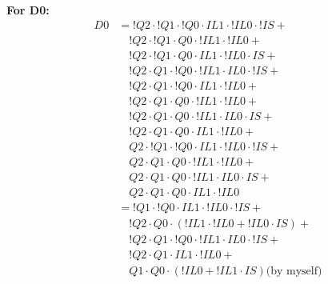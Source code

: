 \begin{multicols}{2}
    \textbf{For D0:}
    \begin{align*}
        D0  &=     !Q2 \cdot !Q1 \cdot !Q0 \cdot  IL1 \cdot !IL0 \cdot !IS + \\
            &\quad !Q2 \cdot !Q1 \cdot  Q0 \cdot !IL1 \cdot !IL0 + \\
            &\quad !Q2 \cdot !Q1 \cdot  Q0 \cdot  IL1 \cdot !IL0 \cdot  IS + \\
            &\quad !Q2 \cdot  Q1 \cdot !Q0 \cdot !IL1 \cdot  IL0 \cdot !IS + \\
            &\quad !Q2 \cdot  Q1 \cdot !Q0 \cdot  IL1 \cdot !IL0 + \\
            &\quad !Q2 \cdot  Q1 \cdot  Q0 \cdot !IL1 \cdot !IL0 + \\
            &\quad !Q2 \cdot  Q1 \cdot  Q0 \cdot !IL1 \cdot  IL0 \cdot  IS + \\
            &\quad !Q2 \cdot  Q1 \cdot  Q0 \cdot  IL1 \cdot !IL0 + \\
            &\quad  Q2 \cdot !Q1 \cdot !Q0 \cdot  IL1 \cdot !IL0 \cdot !IS + \\
            &\quad  Q2 \cdot  Q1 \cdot  Q0 \cdot !IL1 \cdot !IL0 + \\
            &\quad  Q2 \cdot  Q1 \cdot  Q0 \cdot !IL1 \cdot  IL0 \cdot  IS + \\
            &\quad  Q2 \cdot  Q1 \cdot  Q0 \cdot  IL1 \cdot !IL0 \\
           &=     !Q1 \cdot !Q0 \cdot  IL1 \cdot !IL0 \cdot !IS + \\
           &\quad !Q2 \cdot  Q0 \cdot (!IL1 \cdot !IL0 + !IL0 \cdot  IS) + \\
           &\quad !Q2 \cdot  Q1 \cdot !Q0  \cdot !IL1 \cdot  IL0 \cdot !IS + \\
           &\quad !Q2 \cdot  Q1 \cdot  IL1 \cdot !IL0 + \\
           &\quad  Q1 \cdot  Q0 \cdot (!IL0 + !IL1 \cdot  IS) \text{(by myself)} \\

\end{align*}
\end{multicols}
